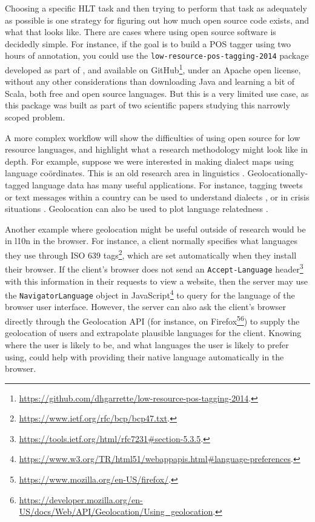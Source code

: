 Choosing a specific HLT task and then trying to perform that task as adequately as possible is one strategy for figuring out how much open source code exists, and what that looks like. There are cases where using open source software is decidedly simple. For instance, if the goal is to build a POS tagger using two hours of annotation, you could use the {\tt low-resource-pos-tagging-2014} package developed as part of \citet{garrette2013real,garrette2013learning}, and available on GitHub\footnote{\href{https://github.com/dhgarrette/low-resource-pos-tagging-2014}{https://github.com/dhgarrette/low-resource-pos-tagging-2014}. }, under an Apache open license, without any other considerations than downloading Java and learning a bit of Scala, both free and open source languages. But this is a very limited use case, as this package was built as part of two scientific papers studying this narrowly scoped problem.

A more complex workflow will show the difficulties of using open source for low resource languages, and highlight what a research methodology might look like in depth. For example, suppose we were interested in making dialect maps using language co\"ordinates. This is an old research area in linguistics \citep{trudgill1983on,labov2005atlas}. Geolocationally-tagged language data has many useful applications. For instance, tagging tweets or text messages within a country can be used to understand dialects \citep{mubarak2014using}, or in crisis situations \citep{lewis2010haitian}. Geolocation can also be used to plot language relatedness \citep{littauer2012visualizing}.

Another example where geolocation might be useful outside of research would be in l10n in the browser. For instance, a client normally specifies what languages they use through ISO 639 tags\footnote{\href{https://www.ietf.org/rfc/bcp/bcp47.txt}{https://www.ietf.org/rfc/bcp/bcp47.txt}. }, which are set automatically when they install their browser. If the client's browser does not send an {\tt Accept-Language} header\footnote{\href{https://tools.ietf.org/html/rfc7231\#section-5.3.5}{https://tools.ietf.org/html/rfc7231\#section-5.3.5}. } with this information in their requests to view a website, then the server may use the {\tt Navigator\-Language} object in JavaScript\footnote{\href{https://www.w3.org/TR/html51/webappapis.html\#language-preferences}{https://www.w3.org/TR/html51/webappapis.html\#language-preferences}. } to query for the language of the browser user interface. However, the server can also ask the client's browser directly through the Geolocation API (for instance, on Firefox\footnote{\href{https://www.mozilla.org/en-US/firefox/}{https://www.mozilla.org/en-US/firefox/}. }\footnote{\href{https://developer.mozilla.org/en-US/docs/Web/API/Geolocation/Using_geolocation}{https://developer.mozilla.org/en-US/docs/Web/API/Geolocation/Using\_geolocation}. }) to supply the geolocation of users and extrapolate plausible languages for the client. Knowing where the user is likely to be, and what languages the user is likely to prefer using, could help with providing their native language automatically in the browser.

